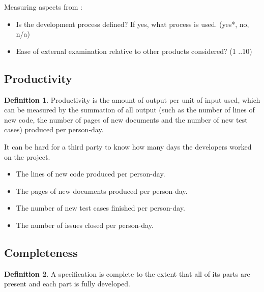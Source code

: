 \documentclass{article}
\theoremstyle{definition}
\newtheorem{defn}{Definition}
\begin{document}
\noindent Measuring aspects from \citep{SmithEtAl2018}:
\begin{itemize}
\item Is the development process defined? If yes, what process is used. ({yes*,
no, n/a})
\item Ease of external examination relative to other products considered? ({1 ..10})
\end{itemize}

\subsection{Productivity}
\begin{defn}
Productivity is the amount of output per unit of input used, which can be
measured by the summation of all output (such as the number of lines of new
code, the number of pages of new documents and the number of new test cases)
produced per person-day.
\end{defn}

It can be hard for a third party to know how many days the developers worked on
the project.

\begin{itemize}
\item The lines of new code produced per person-day.
\item The pages of new documents produced per person-day.
\item The number of new test cases finished per person-day.
\item The number of issues closed per person-day.
\end{itemize}

\subsection{Completeness}
\begin{defn}
A specification is complete to the extent that all of its parts are present and
each part is fully developed.
\end{defn}
\end{document}
